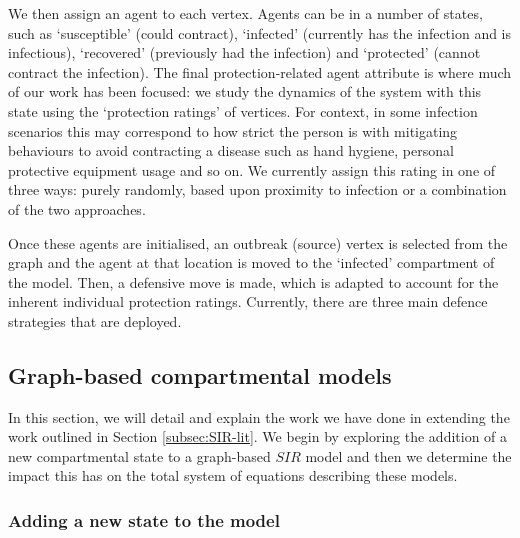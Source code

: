\documentclass[../report.tex]{subfiles}
\begin{document}
We then assign an agent to each vertex. Agents can be in a number of states, such as `susceptible' (could contract), `infected' (currently has the infection and is infectious), `recovered' (previously had the infection) and `protected' (cannot contract the infection). The final protection-related agent attribute is where much of our work has been focused: we study the dynamics of the system with this state using the `protection ratings' of vertices. For context, in some infection scenarios this may correspond to how strict the person is with mitigating behaviours to avoid contracting a disease such as hand hygiene, personal protective equipment usage and so on. We currently assign this rating in one of three ways: purely randomly, based upon proximity to infection or a combination of the two approaches.

Once these agents are initialised, an outbreak (source) vertex is selected from the graph and the agent at that location is moved to the `infected' compartment of the model. Then, a defensive move is made, which is adapted to account for the inherent individual protection ratings. Currently, there are three main defence strategies that are deployed.

\subsection{Graph-based compartmental models}

In this section, we will detail and explain the work we have done in extending the work outlined in Section \ref{subsec:SIR-lit}. We begin by exploring the addition of a new compartmental state to a graph-based $SIR$ model and then we determine the impact this has on the total system of equations describing these models.

\subsubsection{Adding a new state to the model}
\end{document}
